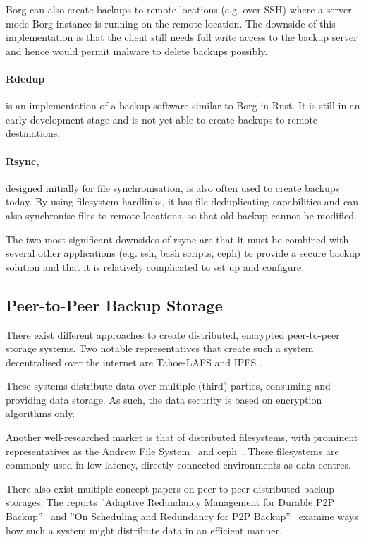 Borg can also create backups to remote locations (e.g. over SSH) where a server-mode Borg instance is running on the remote location. The downside of this implementation is that the \gls{client} still needs full write access to the backup server and hence would permit malware to delete backups possibly.

\paragraph{Rdedup} \cite{rdedup} is an implementation of a backup software similar to Borg in Rust. It is still in an early development stage and is not yet able to create backups to remote destinations.

\paragraph{Rsync,} \cite{rsync} designed initially for file synchronisation, is also often used to create backups today. By using filesystem-hardlinks, it has file-deduplicating capabilities and can also synchronise files to remote locations, so that old backup cannot be modified.

The two most significant downsides of rsync are that it must be combined with several other applications (e.g. ssh, bash scripts, ceph) to provide a secure backup solution and that it is relatively complicated to set up and configure.

\subsection{Peer-to-Peer Backup Storage}
There exist different approaches to create distributed, encrypted peer-to-peer storage systems. Two notable representatives that create such a system decentralised over the internet are Tahoe-LAFS \cite{tahoe-lafs} and IPFS \cite{ipfs}.

These systems distribute data over multiple (third) parties, consuming and providing data storage. As such, the data security is based on encryption algorithms only.

Another well-researched market is that of distributed filesystems, with prominent representatives as the Andrew File System~\cite{afs} and ceph~\cite{ceph}. These filesystems are commonly used in low latency, directly connected environments as data centres.

There also exist multiple concept papers on peer-to-peer distributed backup storages. The reports ''Adaptive Redundancy Management for Durable P2P
Backup''~\cite{p2p-redundancy} and ''On Scheduling and Redundancy for P2P Backup''~\cite{p2p-scheduling} examine ways how such a system might distribute data in an efficient manner.

